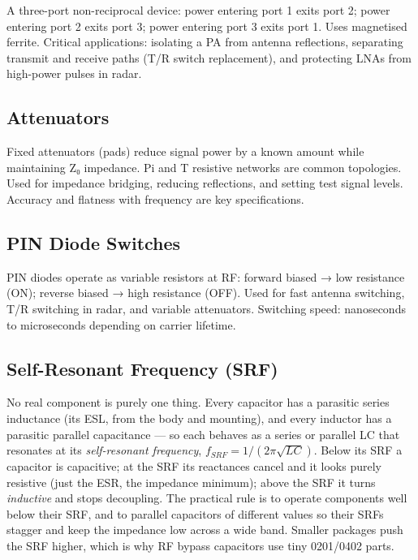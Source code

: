 				

A three-port non-reciprocal device: power entering port 1 exits port 2; power entering port 2 exits port 3; power entering port 3 exits port 1. Uses magnetised ferrite. Critical applications: isolating a PA from antenna reflections, separating transmit and receive paths (T/R switch replacement), and protecting LNAs from high-power pulses in radar.

				

\subsection{Attenuators}

				

Fixed attenuators (pads) reduce signal power by a known amount while maintaining Z₀ impedance. Pi and T resistive networks are common topologies. Used for impedance bridging, reducing reflections, and setting test signal levels. Accuracy and flatness with frequency are key specifications.

				

\subsection{PIN Diode Switches}

				

PIN diodes operate as variable resistors at RF: forward biased → low resistance (ON); reverse biased → high resistance (OFF). Used for fast antenna switching, T/R switching in radar, and variable attenuators. Switching speed: nanoseconds to microseconds depending on carrier lifetime.

				

\subsection{Self-Resonant Frequency (SRF)}

				

No real component is purely one thing. Every capacitor has a parasitic series inductance (its ESL, from the body and mounting), and every inductor has a parasitic parallel capacitance — so each behaves as a series or parallel LC that resonates at its \emph{self-resonant frequency}, $f_{SRF}=1/(2\pi\sqrt{LC})$. Below its SRF a capacitor is capacitive; at the SRF its reactances cancel and it looks purely resistive (just the ESR, the impedance minimum); above the SRF it turns \emph{inductive} and stops decoupling. The practical rule is to operate components well below their SRF, and to parallel capacitors of different values so their SRFs stagger and keep the impedance low across a wide band. Smaller packages push the SRF higher, which is why RF bypass capacitors use tiny 0201/0402 parts.



